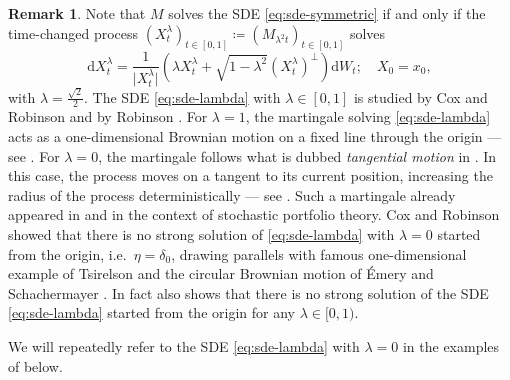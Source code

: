 \documentclass[12pt,oneside]{amsart}
\theoremstyle{definition}
\newtheorem{remark}[theorem]{Remark}
\newcommand{\D}{\mathrm{d}}
\numberwithin{equation}{section}
\begin{document}
\begin{remark}
	Note that $M$ solves the SDE \eqref{eq:sde-symmetric} if and only if the time-changed process $(X^\lambda_t)_{t \in [0, 1]} \coloneqq (M_{\lambda^2 t})_{t \in [0, 1]}$ solves
	\begin{equation}\label{eq:sde-lambda}
		\D X^\lambda_t = \frac{1}{\lvert X^\lambda_t \rvert}(\lambda X^\lambda_t + \sqrt{1 - \lambda^2} (X^\lambda_t)^\perp) \D W_t; \quad X_0 = x_0,
	\end{equation}
	with $\lambda = \frac{\sqrt{2}}{2}$. The SDE \eqref{eq:sde-lambda} with $\lambda \in [0, 1]$ is studied by Cox and Robinson \cite{CoRo21, CoRo22} and by Robinson \cite{Ro20}. For $\lambda = 1$, the martingale solving \eqref{eq:sde-lambda} acts as a one-dimensional Brownian motion on a fixed line through the origin --- see . For $\lambda = 0$, the martingale follows what is dubbed \emph{tangential motion} in \cite{CoRo21, CoRo22}. In this case, the process moves on a tangent to its current position, increasing the radius of the process deterministically --- see . Such a martingale already appeared in \cite{Fe18} and \cite{LaRu20} in the context of stochastic portfolio theory. Cox and Robinson \cite[Theorem 1.1]{CoRo22} showed that there is no strong solution of \eqref{eq:sde-lambda} with $\lambda = 0$ started from the origin, i.e.~$\eta = \delta_0$, drawing parallels with famous one-dimensional example of Tsirelson \cite{Ts76} and the circular Brownian motion of \'Emery and Schachermayer \cite{EmSc99}. In fact \cite[Theorem 1.2]{CoRo22} also shows that there is no strong solution of the SDE \eqref{eq:sde-lambda} started from the origin for any $\lambda \in [0, 1)$.
	 
	 We will repeatedly refer to the SDE \eqref{eq:sde-lambda} with $\lambda = 0$ in the examples of  below.
	 \end{remark}
\end{document}
